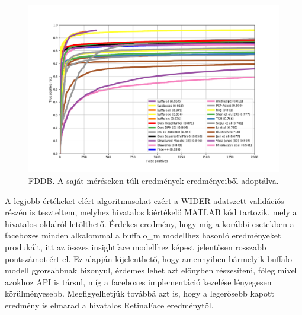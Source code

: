 \begin{figure}
    \centering
    \includegraphics[width=\linewidth]{figures/fddb.png}
    \caption{FDDB. A saját méréseken túli eredmények \cite{zhang_face_eval_2021} eredményeiből adoptálva.}
    \label{fig:fddb_evaluation}
\end{figure}


A legjobb értékeket elért algoritmusokat ezért a WIDER adatszett validációs részén is teszteltem, melyhez hivatalos kiértékelő MATLAB kód tartozik, mely a hivatalos oldalról\cite{noauthor_wider_nodate} letölthető. Érdekes eredmény, hogy míg a korábbi esetekben a faceboxes minden alkalommal a buffalo\_m modellhez hasonló eredményeket produkált, itt az összes insightface modellhez képest jelentősen rosszabb pontszámot ért el. Ez alapján kijelenthető, hogy amennyiben bármelyik buffalo modell gyorsabbnak bizonyul, érdemes lehet azt előnyben részesíteni, főleg mivel azokhoz API is társul, míg a faceboxes implementáció kezelése lényegesen körülményesebb. Megfigyelhetjük továbbá azt is, hogy a legerősebb kapott eredmény is elmarad a hivatalos RetinaFace eredménytől.

